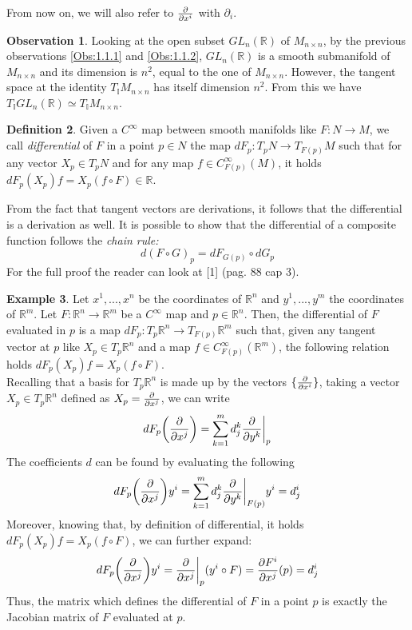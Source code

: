\documentclass[12pt,a4paper]{report}
\theoremstyle{definition}
\newtheorem{Def}{Definition}[chapter]
\theoremstyle{Theorem}
\theoremstyle{definition}
\newtheorem{Ex}[Def]{Example}
\theoremstyle{definition}
\newtheorem{Obs}[Def]{Observation}
\begin{document}
	From now on, we will also refer to $\partial\over \partial x^i$ with $\partial_i$.
	\begin{Obs} \label{Obs 1.1.3}
		Looking at the open subset $GL_n(\mathbb{R})$ of $M_{n\times n}$, by the previous observations \ref{Obs:1.1.1} and \ref{Obs:1.1.2}, $GL_n(\mathbb{R})$ is a smooth submanifold of $M_{n\times n}$ and its dimension is $n^2$, equal to the one of $M_{n\times n}$. However, the tangent space at the identity $T_\mathbb{I}M_{n\times n}$ has itself dimension $n^2$. From this we have $T_\mathbb{I}GL_n(\mathbb{R})\simeq T_\mathbb{I}M_{n\times n}$.
	\end{Obs}
	\begin{Def}
		Given a $C^\infty$ map between smooth manifolds like $F:N\rightarrow M$, we call \textit{differential} of $F$ in a point $p\in N$ the map $dF_p:T_pN\rightarrow T_{F(p)}M$ such that for any vector $X_p\in T_pN$ and for any map $f\in C_{F(p)}^\infty(M)$, it holds $dF_p(X_p)f=X_p(f\circ F)\in\mathbb{R}$.
	\end{Def}
	From the fact that tangent vectors are derivations, it follows that the differential is a derivation as well. It is possible to show that the differential of a composite function follows the \textit{chain rule:} 
	$$d(F\circ G)_p=dF_{G(p)}\circ dG_p$$ 
	For the full proof the reader can look at [1] (pag. 88 cap 3).
	\begin{Ex}
		Let $x^1,...,x^n$ be the coordinates of $\mathbb{R}^n$ and $y^1,...,y^m$ the coordinates of $\mathbb{R}^m$. Let $F:\mathbb{R}^n\rightarrow \mathbb{R}^m$ be a $C^\infty$ map and $p\in \mathbb{R}^n$. Then, the differential of $F$ evaluated in $p$ is a map $dF_p:T_p\mathbb{R}^n\rightarrow T_{F(p)}\mathbb{R}^m$ such that, given any tangent vector at $p$ like $X_p\in T_p\mathbb{R}^n$ and a map $f\in C_{F(p)}^\infty(\mathbb{R}^m)$, the following relation holds $dF_p(X_p)f=X_p(f\circ F)$.\\
		Recalling that a basis for $T_p\mathbb{R}^n$ is made up by the vectors $\{{\partial\over\partial x^i}\}$, taking a vector $X_p\in T_p\mathbb{R}^n$ defined as $X_p={\partial\over \partial x^j}$, we can write $$dF_p\bigg{(}{\partial\over \partial x^j}\bigg{)}=\sum_{k=1}^{m}d_j^k{\partial\over \partial y^k}\bigg{\rvert}_p$$
		The coefficients $d$ can be found by evaluating the following 
		$$dF_p\bigg{(}{\partial\over \partial x^j}\bigg{)}y^i=\sum_{k=1}^{m}d_j^k{\partial\over \partial y^k}\bigg{\rvert}_{F(p)}y^i=d_j^i$$
		Moreover, knowing that, by definition of differential, it holds $dF_p(X_p)f=X_p(f\circ F)$, we can further expand:
		$$dF_p\bigg{(}{\partial\over \partial x^j}\bigg{)}y^i={\partial\over \partial x^j}\bigg{\rvert}_p(y^i\circ F)={\partial F^i\over \partial x^j}(p)=d^i_j$$
		Thus, the matrix which defines the differential of $F$ in a point $p$ is exactly the Jacobian matrix of $F$ evaluated at $p$.
	\end{Ex}
\end{document}
